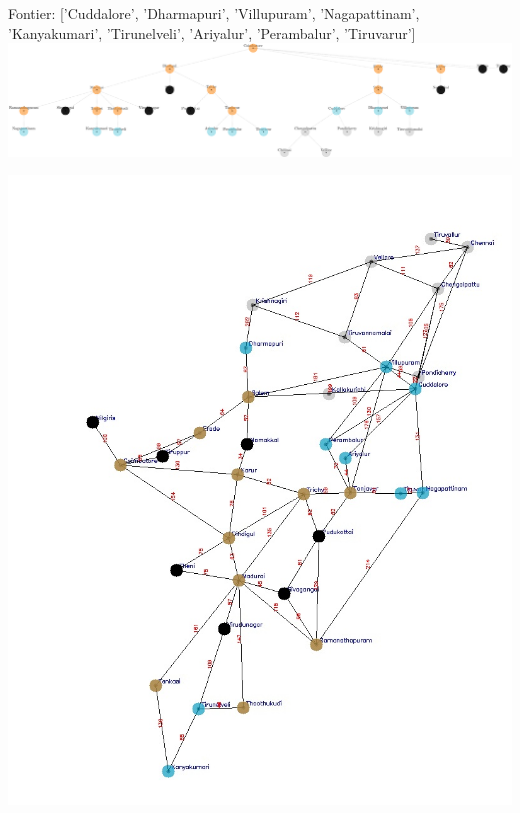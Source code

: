 \documentclass[xcolor=table]{beamer}
\begin{document}
\begin{frame}
  { \tiny Fontier: ['Cuddalore', 'Dharmapuri', 'Villupuram', 'Nagapattinam', 'Kanyakumari', 'Tirunelveli', 'Ariyalur', 'Perambalur', 'Tiruvarur']}
  \includegraphics[width=1\textwidth]{../BFSNodes/27-1.png}
  \begin{center}
    \includegraphics[height=0.55\textheight]{../BFSoutput/tamilBFS25.jpg}
  \end{center}
\end{frame}
\end{document}
